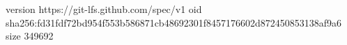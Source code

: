 version https://git-lfs.github.com/spec/v1
oid sha256:fd31fdf72bd954f553b586871cb48692301f8457176602d872450853138af9a6
size 349692
